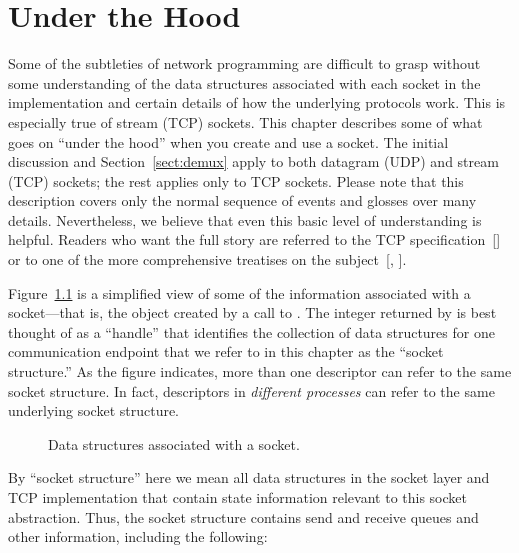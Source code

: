 \chapter{Under the Hood}
\label{chap:under}%
\newcommand{\netstat}{\texttt{netstat}}

Some of the subtleties of network programming are difficult to grasp
without some understanding of the data structures associated with each
socket in the implementation and certain details of how the underlying
protocols work.  This is especially true of stream (TCP) sockets.
This chapter describes some of what goes on ``under the hood'' when you
create and use a socket.
The initial discussion and Section~\ref{sect:demux} apply to both
datagram (UDP) and stream (TCP) sockets; the rest applies only to TCP
sockets.
Please note that
this description covers only the normal sequence of events and glosses
over many details.  Nevertheless, we believe that even this basic
level of understanding is helpful.  Readers who want the full story
are referred to the TCP specification~[\cite{RFC793}] or to one of the
more comprehensive treatises on the subject~[\cite{ComerV2},
\cite{StevensV2}].

Figure~\ref{fig:structures} is a simplified view of some of the
information associated with a socket---that is, the object created by
a call to .  The integer returned by  is
best thought of as a ``handle'' that identifies the collection of data
structures for one communication endpoint that we refer to in this
chapter as the ``socket structure.''
As the figure indicates, more than one
descriptor can refer to the same socket structure.  In fact,
descriptors in \emph{different processes} can refer to the same
underlying socket structure.

\begin{figure}
\caption{\label{fig:structures}Data structures associated with a socket.}
\end{figure}

By ``socket structure'' here we mean all data structures
in the socket layer and TCP implementation that contain state
information relevant to this socket abstraction. 
Thus, the socket structure contains send and receive
queues and other information, including the following:


